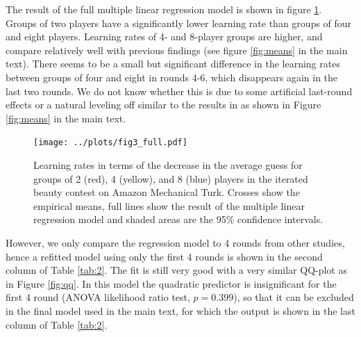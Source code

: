 The result of the full multiple linear regression model is shown in figure \ref{fig:full}. Groups of two players have a significantly lower learning rate than groups of four and eight players. Learning rates of 4- and 8-player groups are higher, and compare relatively well with previous findings (see figure \ref{fig:means} in the main text). There seems to be a small but significant difference in the learning rates between groups of four and eight in rounds 4-6, which disappears again in the last two rounds. We do not know whether this is due to some artificial last-round effects or a natural leveling off similar to the results in \citet{weber2003learning} as shown in Figure \ref{fig:means} in the main text.

\begin{figure}[h]
\texttt{[image: ../plots/fig3\_full.pdf]}\caption{Learning rates in terms of the decrease in the average guess for groups of 2 (red), 4 (yellow), and 8 (blue) players in the iterated beauty contest on Amazon Mechanical Turk. Crosses show the empirical means, full lines show the result of the multiple linear regression model and shaded areas are the 95\% confidence intervals.}
\label{fig:full}
\end{figure}


However, we only compare the regression model to 4 rounds from other studies, hence a refitted model using only the first 4 rounds is shown in the second column of Table \ref{tab:2}. The fit is still very good with a very similar QQ-plot as in Figure \ref{fig:qq}. In this model the quadratic predictor is insignificant for the first 4 round (ANOVA likelihood ratio test, $p = 0.399$), so that it can be excluded in the final model used in the main text, for which the output is shown in the last column of Table \ref{tab:2}.
